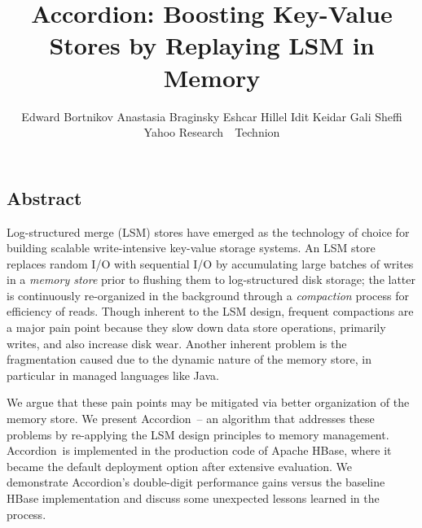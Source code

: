 \documentclass{vldb}
\newcommand{\remove}[1]{}
\newcommand{\tb}{\hspace{5mm}}
\newcommand{\sys}{Accordion}
\begin{document}
\date{}

\title{\Large \bf  \sys: Boosting Key-Value Stores by Replaying LSM in Memory}


\author{
Edward Bortnikov\footnotemark[1]  \tb
Anastasia Braginsky\footnotemark[1]  \tb
Eshcar Hillel\footnotemark[1] \tb 
Idit Keidar\footnotemark[1] \footnotemark[2] \tb
Gali Sheffi\footnotemark[1] \\
	\footnotemark[1] Yahoo Research\ \ \footnotemark[2] Technion  \\ [2mm]
} %

\maketitle




\subsection*{Abstract}

Log-structured merge (LSM) stores have emerged as the technology of choice for building scalable 
write-intensive key-value storage systems. An LSM store replaces random I/O with sequential 
I/O by accumulating large batches of writes in a \emph{memory store} prior to flushing them to log-structured 
disk storage; the latter is continuously re-organized in the background through a \emph{compaction}
process for efficiency of reads. Though inherent to the LSM design, frequent compactions are a major pain point 
because they slow down data store operations, primarily writes, and also increase disk wear. 
Another inherent problem is the fragmentation caused due to the dynamic nature of the memory store, in particular in managed languages like Java. 

We argue that these pain points may be mitigated via better  organization of the memory store.
We present \sys\ -- an algorithm that addresses these problems by re-applying
the LSM design principles to memory management. 
\sys\ is implemented in the production code of Apache HBase, where it became the default deployment option 
after extensive evaluation. We demonstrate \sys's double-digit performance gains versus 
the baseline HBase implementation and discuss some unexpected lessons learned in the process. 
\end{document}
